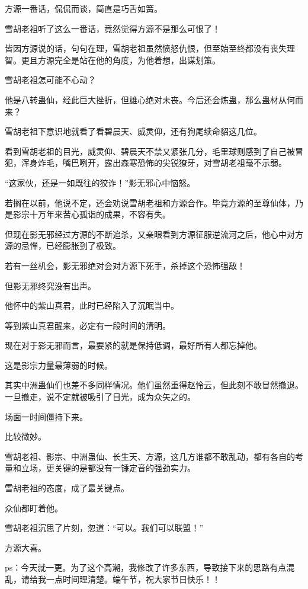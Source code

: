 \begin{this_body}
方源一番话，侃侃而谈，简直是巧舌如簧。

雪胡老祖听了这么一番话，竟然觉得方源不是那么可恨了！

皆因方源说的话，句句在理，雪胡老祖虽然愤怒仇恨，但至始至终都没有丧失理智。更且方源完全是站在他的角度，为他着想，出谋划策。

雪胡老祖怎可能不心动？

他是八转蛊仙，经此巨大挫折，但雄心绝对未丧。今后还会炼蛊，那么蛊材从何而来？

雪胡老祖下意识地就看了看碧晨天、威灵仰，还有狗尾续命貂这几位。

看到雪胡老祖的目光，威灵仰、碧晨天不禁又紧张几分，毛里球则感到了自己被冒犯，浑身炸毛，嘴巴咧开，露出森寒恐怖的尖锐獠牙，对雪胡老祖毫不示弱。

“这家伙，还是一如既往的狡诈！”影无邪心中恼怒。

若搁在以前，他说不定，还会劝说雪胡老祖和方源合作。毕竟方源的至尊仙体，乃是影宗十万年来苦心孤诣的成果，不容有失。

但现在影无邪经过方源的不断追杀，又亲眼看到方源征服逆流河之后，他心中对方源的忌惮，已经膨胀到了极致。

若有一丝机会，影无邪绝对会对方源下死手，杀掉这个恐怖强敌！

但影无邪终究没有出声。

他怀中的紫山真君，此时已经陷入了沉眠当中。

等到紫山真君醒来，必定有一段时间的清明。

现在对于影无邪而言，最要紧的就是保持低调，最好所有人都忘掉他。

这是影宗力量最薄弱的时候。

其实中洲蛊仙们也差不多同样情况。他们虽然重得赵怜云，但此刻不敢冒然撤退。一旦撤走，说不定就被吸引了目光，成为众矢之的。

场面一时间僵持下来。

比较微妙。

雪胡老祖、影宗、中洲蛊仙、长生天、方源，这几方谁都不敢乱动，都有各自的考量和立场，更关键的是都没有一锤定音的强劲实力。

雪胡老祖的态度，成了最关键点。

众仙都盯着他。

雪胡老祖沉思了片刻，忽道：“可以。我们可以联盟！”

方源大喜。

ps：今天就一更。为了这个高潮，我修改了许多东西，导致接下来的思路有点混乱，请给我一点时间理清楚。端午节，祝大家节日快乐！！

\end{this_body}

